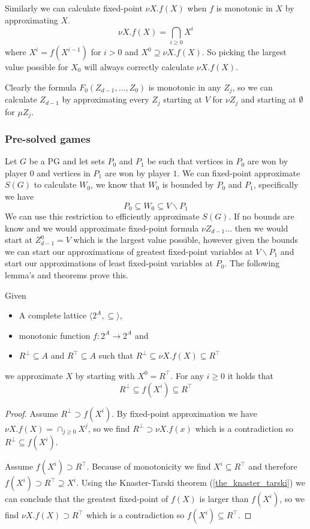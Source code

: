 Similarly we can calculate fixed-point $\nu X.f(X)$ when $f$ is monotonic in $X$ by approximating $X$.
\[ \nu X.f(X) = \bigcap_{i \geq 0} X^i \]
where $X^i = f(X^{i-1})$ for $i > 0$ and $X^0 \supseteq \nu X.f(X)$. So picking the largest value possible for $X_0$ will always correctly calculate $\nu X. f(X)$.

Clearly the formula $F_0(Z_{d-1},\dots,Z_0)$ is monotonic in any $Z_j$, so we can calculate $Z_{d-1}$ by approximating every $Z_j$ starting at $V$ for $\nu Z_j$ and starting at $\emptyset$ for $\mu Z_j$.


\subsubsection{Pre-solved games}
Let $G$ be a PG and let sets $P_0$ and $P_1$ be such that vertices in $P_0$ are won by player $0$ and vertices in $P_1$ are won by player $1$. We can fixed-point approximate $S(G)$ to calculate $W_0$, we know that $W_0$ is bounded by $P_0$ and $P_1$, specifically we have
\[ P_0 \subseteq W_0 \subseteq V\backslash P_1\]
We can use this restriction to efficiently approximate $S(G)$. If no bounds are know and we would approximate fixed-point formula $\nu Z_{d-1}\dots$ then we would start at $Z_{d-1}^0 = V$ which is the largest value possible, however given the bounds we can start our approximations of greatest fixed-point variables at $V\backslash P_1$ and start our approximations of least fixed-point variables at $P_0$. The following lemma's and theorems prove this.
\begin{lemma}
	\label{lem_fixpoint_bounds_nu}
	Given
	\begin{itemize}
		\item A complete lattice $\langle 2^A, \subseteq \rangle$,
		\item monotonic function $f : 2^A \rightarrow 2^A$ and
		\item $R^\bot \subseteq A$ and $R^\top \subseteq A$ such that $R^\bot \subseteq \nu X. f(X) \subseteq R^\top$
	\end{itemize}
	we approximate $X$ by starting with $X^0 = R^\top$. For any $i \geq 0$ it holds that
	\[ R^\bot \subseteq f(X^i) \subseteq R^\top \]
	\begin{proof}
		Assume $R^\bot \supset f(X^i)$. By fixed-point approximation we have $\nu X.f(X) = \cap_{j\geq0} X^j$, so we find $R^\bot \supset \nu X.f(x)$ which is a contradiction so $R^\bot \subseteq f(X^i)$.
		
		Assume $f(X^i) \supset R^\top$. Because of monotonicity we find $X^i \subseteq R^\top$ and therefore $f(X^i) \supset R^\top \supseteq X^i$. Using the Knaster-Tarski theorem (\ref{the_knaster_tarski}) we can conclude that the greatest fixed-point of $f(X)$ is larger than $f(X^i)$, so we find $\nu X.f(X) \supset R^\top$ which is a contradiction so $f(X^i) \subseteq R^\top$.
	\end{proof}
\end{lemma}

